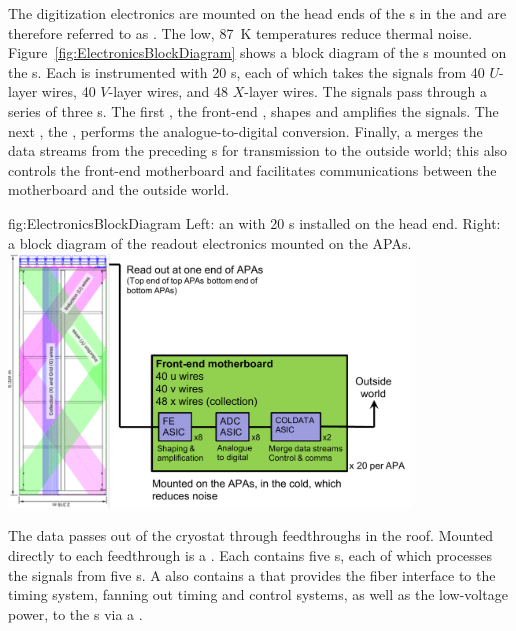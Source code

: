 The digitization electronics are mounted on the head ends of the s in the  and are therefore referred to as . The low, \SI{87}{\kelvin} temperatures reduce thermal noise. Figure~\ref{fig:ElectronicsBlockDiagram} shows a block diagram of the s mounted on the s. Each  is instrumented with 20 s, each of which takes the signals from 40 $U$-layer wires, 40 $V$-layer wires, and 48 $X$-layer wires. The signals pass through a series of three s. The first , the front-end , shapes and amplifies the signals. The next , the  , performs the analogue-to-digital conversion. Finally, a   merges the data streams from the preceding s for transmission to the outside world; this   also controls the front-end motherboard and facilitates communications between the motherboard and the outside world.

\begin{dunefigure}{fig:ElectronicsBlockDiagram}
{Left: an  with 20 s installed on the head end. Right: a block diagram of the readout electronics mounted on the APAs.}
\includegraphics[width=0.8\textwidth]{graphics/ElectronicsBlockDiagram.pdf}
\end{dunefigure}

The data passes out of the cryostat through feedthroughs in the roof. Mounted directly to each feedthrough is a . Each  contains five s, each of which processes the signals from five s. A  also contains a  that provides the fiber interface to the timing system, fanning out timing and control systems, as well as the low-voltage power, to the s via a .

